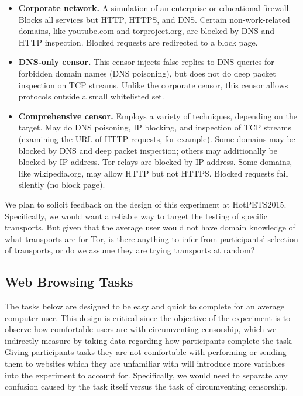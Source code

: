 \documentclass[letterpaper,twocolumn,11pt]{article}
\begin{document}
\begin{itemize} \itemsep1pt \parskip0pt 
\item{\bfseries Corporate network.}
A simulation of an enterprise or educational firewall.
Blocks all services but HTTP, HTTPS, and DNS.
Certain non-work-related domains, like youtube.com and torproject.org,
are blocked by DNS and HTTP inspection.
Blocked requests are redirected to a block page.
\item{\bfseries DNS-only censor.}
This censor injects false replies to DNS queries
for forbidden domain names (DNS poisoning),
but does not do deep packet inspection on TCP streams.
Unlike the corporate censor, this censor allows protocols
outside a small whitelisted set.
\item{\bfseries Comprehensive censor.}
Employs a variety of techniques, depending on the target.
May do DNS poisoning, IP blocking, and inspection of TCP streams
(examining the URL of HTTP requests, for example).
Some domains may be blocked by DNS and deep packet inspection;
others may additionally be blocked by IP address.
Tor relays are blocked by IP address.
Some domains, like wikipedia.org, may allow HTTP but not HTTPS.
Blocked requests fail silently (no block page).
\end{itemize}

We plan to solicit feedback on the design of this experiment at HotPETS2015.
Specifically, we would want a reliable way to target the testing of 
specific transports. But given that the average user would not have domain knowledge of 
what transports are for Tor, is there anything to infer from participants' selection of transports, 
or do we assume they are trying transports at random?

\subsection{Web Browsing Tasks}
\indent \indent The tasks below are designed to be easy and quick to complete for an average
computer user. This design is critical since the objective of the experiment is to observe
how comfortable users are with circumventing censorship, which we indirectly measure
by taking data regarding how participants complete the task. Giving participants tasks 
they are not comfortable with performing or sending them to websites which they are 
unfamiliar with will introduce more variables into the experiment to account for. 
Specifically, we would need to separate any confusion caused by the task itself versus
the task of circumventing censorship. 
\end{document}
